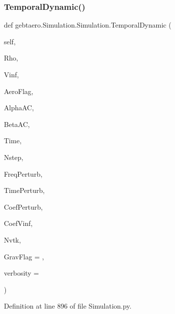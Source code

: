 \subsubsection{\texorpdfstring{Temporal\+Dynamic()}{TemporalDynamic()}}
{\footnotesize\ttfamily def gebtaero.\+Simulation.\+Simulation.\+Temporal\+Dynamic (\begin{DoxyParamCaption}\item[{}]{self,  }\item[{}]{Rho,  }\item[{}]{Vinf,  }\item[{}]{Aero\+Flag,  }\item[{}]{Alpha\+AC,  }\item[{}]{Beta\+AC,  }\item[{}]{Time,  }\item[{}]{Nstep,  }\item[{}]{Freq\+Perturb,  }\item[{}]{Time\+Perturb,  }\item[{}]{Coef\+Perturb,  }\item[{}]{Coef\+Vinf,  }\item[{}]{Nvtk,  }\item[{}]{Grav\+Flag = {},  }\item[{}]{verbosity = {} }\end{DoxyParamCaption})}



Definition at line 896 of file Simulation.\+py.

\mbox{\label{classgebtaero_1_1_simulation_1_1_simulation_a5c540ad628ae1dd51acbe119b317e1ca}} 
